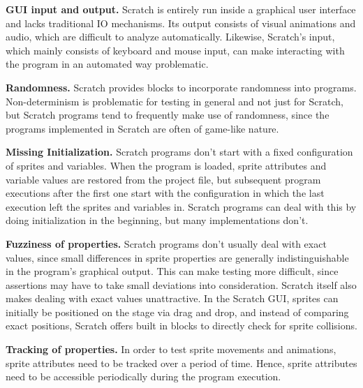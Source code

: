 \textbf{GUI input and output.}
Scratch is entirely run inside a graphical user interface and lacks traditional IO mechanisms.
Its output consists of visual animations and audio, which are difficult to analyze automatically.
Likewise, Scratch's input, which mainly consists of keyboard and mouse input, can make interacting with the program in an automated way problematic.
\parspace

\textbf{Randomness.}
Scratch provides blocks to incorporate randomness into programs.
Non-determinism is problematic for testing in general and not just for Scratch,
but Scratch programs tend to frequently make use of randomness,
since the programs implemented in Scratch are often of game-like nature.
\parspace

\textbf{Missing Initialization.}
Scratch programs don't start with a fixed configuration of sprites and variables.
When the program is loaded, sprite attributes and variable values are restored from the project file,
but subsequent program executions after the first one start with the configuration in which the last execution left the sprites and variables in.
Scratch programs can deal with this by doing initialization in the beginning, but many implementations don't.
\parspace

\textbf{Fuzziness of properties.}
Scratch programs don't usually deal with exact values,
since small differences in sprite properties are generally indistinguishable in the program's graphical output.
This can make testing more difficult, since assertions may have to take small deviations into consideration.
Scratch itself also makes dealing with exact values unattractive.
In the Scratch GUI, sprites can initially be positioned on the stage via drag and drop,
and instead of comparing exact positions, Scratch offers built in blocks to directly check for sprite collisions.
\parspace

\textbf{Tracking of properties.}
In order to test sprite movements and animations, sprite attributes need to be tracked over a period of time.
Hence, sprite attributes need to be accessible periodically during the program execution.
\parspace
